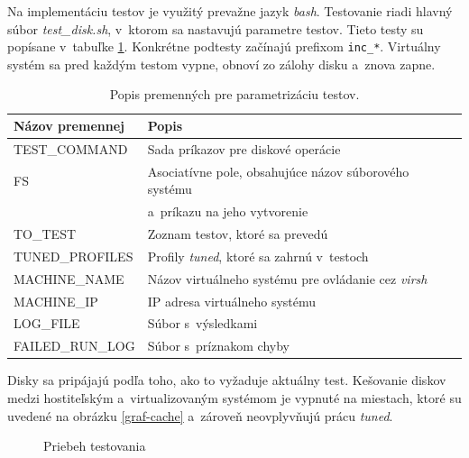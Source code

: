 Na implementáciu testov je využitý prevažne jazyk \emph{bash}. Testovanie riadi
hlavný súbor \emph{test\_disk.sh}, v~ktorom sa nastavujú parametre testov.
Tieto testy su popísane v~tabuľke \ref{tab:test-params}. Konkrétne podtesty
začínajú prefixom \texttt{inc\_*}. Virtuálny systém sa pred každým testom
vypne, obnoví zo zálohy disku a~znova zapne.

\begin{table}[H]
\begin{center}
\begin{tabular}{|l|l|}
    \hline
    \textbf{Názov premennej} & \textbf{Popis} \\
    \hline
    TEST\_COMMAND       & Sada príkazov pre diskové operácie \\
    FS                  & Asociatívne pole, obsahujúce názov súborového systému \\
                        & a~príkazu na jeho vytvorenie \\
    TO\_TEST            & Zoznam testov, ktoré sa prevedú \\
    TUNED\_PROFILES     & Profily \emph{tuned}, ktoré sa zahrnú v~testoch \\
    MACHINE\_NAME       & Názov virtuálneho systému pre ovládanie cez \emph{virsh} \\
    MACHINE\_IP         & IP adresa virtuálneho systému \\
    LOG\_FILE           & Súbor s~výsledkami \\
    FAILED\_RUN\_LOG    & Súbor s~príznakom chyby \\
    \hline
\end{tabular}
\caption{Popis premenných pre parametrizáciu testov.}
\label{tab:test-params}
\end{center}
\end{table}

Disky sa pripájajú podľa toho, ako to vyžaduje aktuálny test. Kešovanie diskov
medzi hostiteľským a~virtualizovaným systémom je vypnuté na miestach, ktoré su
uvedené na obrázku \ref{graf-cache} a~zároveň neovplyvňujú prácu \emph{tuned}. 

%
%

\begin{figure}[ht]
\begin{center}
  \caption{Priebeh testovania}
  \label{pic:testflow}
\end{center}
\end{figure}
%
%

